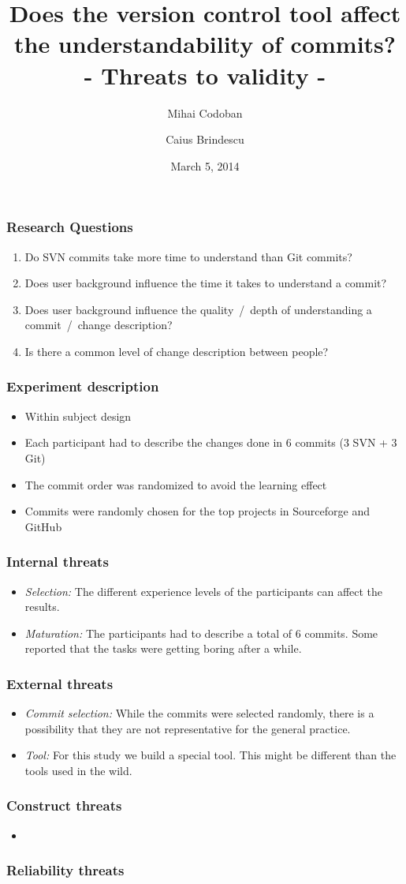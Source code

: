 \documentclass{beamer}
\title{Does the version control tool affect the understandability of commits? \\ - Threats to validity - }
\author{Mihai Codoban \and Caius Brindescu}
\date{March 5, 2014}
\begin{document}
\begin{frame}
\titlepage
\end{frame}

\begin{frame}
\frametitle{Research Questions}
\begin{enumerate}
	\item Do SVN commits take more time to understand than Git commits?
	\item Does user background influence the time it takes to understand a commit?
	\item Does user background influence the quality~/~depth of understanding a commit~/~change description?
	\item Is there a common level of change description between people?
\end{enumerate}
\end{frame}

\begin{frame}
\frametitle{Experiment description}
\begin{itemize}
	\item Within subject design
	\item Each participant had to describe the changes done in 6 commits (3 SVN + 3 Git)
	\item The commit order was randomized to avoid the learning effect
	\item Commits were randomly chosen for the top projects in Sourceforge and GitHub
\end{itemize}
\end{frame}

\begin{frame}
\frametitle{Internal threats}
\begin{itemize}
	\item{\emph{Selection:}} The different experience levels of the participants can affect the results.
	\item{\emph{Maturation:}} The participants had to describe a total of 6 commits. 
	Some reported that the tasks were getting boring after a while.
\end{itemize}
\end{frame}

\begin{frame}
\frametitle{External threats}
\begin{itemize}
	\item{\emph{Commit selection:}} While the commits were selected randomly, there is a possibility that they are not representative for the general practice. 
	\item{\emph{Tool:}} For this study we build a special tool. 
	This might be different than the tools used in the wild.
\end{itemize}
\end{frame}

\begin{frame}
\frametitle{Construct threats}
\begin{itemize}
	\item
\end{itemize}
\end{frame}

\begin{frame}
\frametitle{Reliability threats}
\end{frame}
\end{document}
